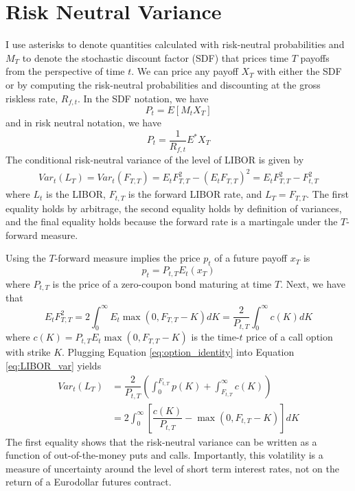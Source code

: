 \documentclass[11pt]{article}
\begin{document}
\section{Risk Neutral Variance}
{\color{blue}I use asterisks to denote quantities calculated with risk-neutral probabilities and $M_{T}$ to denote the stochastic discount factor (SDF) that prices time $T$ payoffs from the perspective of time $t$. We can price any payoff $X_{T}$ with either the SDF or by computing the risk-neutral probabilities and discounting at the gross riskless rate, $R_{f, t}$. In the SDF notation, we have 
\begin{equation*}
	P_{t} = E\left[M_{t}X_{T}\right]
\end{equation*}
and in risk neutral notation, we have 
\begin{equation*}
	P_{t} = \dfrac{1}{R_{f,t}}E^{*}X_{T}
\end{equation*}} 
The conditional risk-neutral variance of the level of LIBOR is given by  
\begin{equation}
\begin{split}
Var_{t}(L_{T}) = Var_{t}(F_{T, T})= E_{t}F_{T, T}^{2}-(E_{t}F_{T, T})^{2}=E_{t}F_{T, T}^{2} - F_{t, T}^{2}
\end{split}
\label{eq:LIBOR_var}
\end{equation}
where $L_{t}$ is the LIBOR, $F_{t, T}$ is the forward LIBOR rate, and $L_{T} = F_{T, T}$. The first equality holds by arbitrage, the second equality holds by definition of variances, and the final equality holds because the forward rate is a martingale under the $T$-forward measure. 

Using the $T$-forward measure implies the price $p_{t}$ of a future payoff $x_{T}$ is 
\begin{equation*}
	p_{t} = P_{t, T}E_{t}(x_{T})
\end{equation*}
where $P_{t, T}$ is the price of a zero-coupon bond maturing at time $T$. Next, we have that 
\begin{equation}
E_{t}F_{T, T}^{2} = 2 \int_{0}^{\infty}E_{t}\max(0, F_{T, T}-K)dK = \dfrac{2}{P_{t, T}}\int_{0}^{\infty} c(K)dK
\label{eq:option_identity}
\end{equation}
where $c(K) = P_{t, T}E_{t}\max(0, F_{T, T}-K)$ is the time-$t$ price of a call option with strike $K$. 
Plugging Equation \ref{eq:option_identity} into Equation \ref{eq:LIBOR_var} yields 
\begin{equation}
\begin{split}
Var_{t}(L_{T}) &= \dfrac{2}{P_{t, T}}\left(\int_{0}^{F_{t, T}}p(K) + \int_{F_{t, T}}^{\infty}c(K)\right)\\
&=2 \int_{0}^{\infty}\left[\dfrac{c(K)}{P_{t, T}}- \max(0, F_{t, T}-K)\right]dK
\end{split}
\label{eq:oom_expression}
\end{equation}
The first equality shows that the risk-neutral variance can be written as a function of out-of-the-money puts and calls. Importantly, this volatility is a measure of uncertainty around the level of short term interest rates, not on the return of a Eurodollar futures contract.\\
\end{document}
